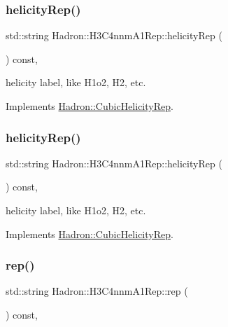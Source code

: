 \subsubsection{\texorpdfstring{helicityRep()}{helicityRep()}\hspace{0.1cm}{\footnotesize\ttfamily [2/3]}}
{\footnotesize\ttfamily std\+::string Hadron\+::\+H3\+C4nnm\+A1\+Rep\+::helicity\+Rep (\begin{DoxyParamCaption}{ }\end{DoxyParamCaption}) const\hspace{0.3cm}{\ttfamily [inline]}, {\ttfamily [virtual]}}

helicity label, like H1o2, H2, etc. 

Implements \mbox{\hyperlink{structHadron_1_1CubicHelicityRep_af1096946b7470edf0a55451cc662f231}{Hadron\+::\+Cubic\+Helicity\+Rep}}.

\mbox{\label{structHadron_1_1H3C4nnmA1Rep_a0bd69f3a04496d18380f553e0fea11b0}} 
\subsubsection{\texorpdfstring{helicityRep()}{helicityRep()}\hspace{0.1cm}{\footnotesize\ttfamily [3/3]}}
{\footnotesize\ttfamily std\+::string Hadron\+::\+H3\+C4nnm\+A1\+Rep\+::helicity\+Rep (\begin{DoxyParamCaption}{ }\end{DoxyParamCaption}) const\hspace{0.3cm}{\ttfamily [inline]}, {\ttfamily [virtual]}}

helicity label, like H1o2, H2, etc. 

Implements \mbox{\hyperlink{structHadron_1_1CubicHelicityRep_af1096946b7470edf0a55451cc662f231}{Hadron\+::\+Cubic\+Helicity\+Rep}}.

\mbox{\label{structHadron_1_1H3C4nnmA1Rep_acd94f02734b3fffdeddaef313469d9dc}} 
\subsubsection{\texorpdfstring{rep()}{rep()}\hspace{0.1cm}{\footnotesize\ttfamily [1/5]}}
{\footnotesize\ttfamily std\+::string Hadron\+::\+H3\+C4nnm\+A1\+Rep\+::rep (\begin{DoxyParamCaption}{ }\end{DoxyParamCaption}) const\hspace{0.3cm}{\ttfamily [inline]}, {\ttfamily [virtual]}}



